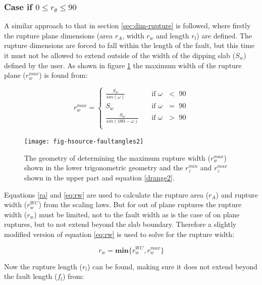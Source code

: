 \subsubsection{Case if  $0 \leq r_\theta \leq 90$} \label{sec:0to90}

A similar approach to that in section \ref{sec:dim-rupture} is followed, where firstly the rupture plane dimensions (area $r_A$, width $r_w$ and length $r_l$) are defined. The rupture dimensions are forced to fall 
within the length of the fault, but this time it must not be allowed to extend outside of the width of the dipping slab ($S_w$) defined by the user. As shown in figure \ref{fig:deltaeq} the 
maximum width of the rupture plane ($r_w^{max}$) is found from:

\begin{equation}\label{rwmax}
r_w^{max} = 
\begin{cases}
 \frac{ S_w }{sin (\omega)}		& \quad \mbox{if $\omega$ $<$ 90} \\
S_w							& \quad \mbox{if $\omega$ $=$ 90} \\
 \frac{ S_w }{sin (180 - \omega ) }	& \quad \mbox{if $\omega$ $>$ 90} \\
\end{cases}
\end{equation}


\begin{figure}[htp]
\centerline{\texttt{[image: fig-hsource-faultangles2]}}
\caption{The geometry of determining the maximum rupture width ($r_w^{max}$) shown in the lower trigonometric geometry and the $r_z^{min}$ and $r_z^{max}$ shown in the upper part and equation \ref{drange2}.}
\label{fig:deltaeq}
\end{figure}

Equations \ref{ra} and \ref{eq:rw} are used to calculate the rupture area ($r_A$) and rupture width ($r_w^{WC}$) from the \citep{eqrm_Wells94} 
scaling laws. But for out of plane ruptures the rupture width ($r_w$) must be limited, not to the fault width as is the case 
of on plane ruptures, but to not extend beyond the slab boundary. Therefore a slightly modified version of 
equation \ref{eq:rw} is used to solve for the rupture width:

\begin{equation} \label{rw090}
r_w = \mathbf{min}\{ r_w^{WC}, r_w^{max}\}
\end{equation}

Now the rupture length ($r_l$) can be found, making sure it does not extend beyond the fault length ($f_l$) from:

